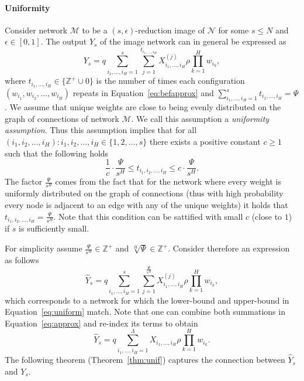 \documentclass[twoside]{article}
\begin{document}
\paragraph{Uniformity}
Consider network $\mathcal{M}$ to be a $(s,\epsilon)$-reduction image of $\mathcal{N}$ for some $s \leq N$ and $\epsilon \in [0,1]$. The output $Y_s$ of the image network can in general be expressed as
\[Y_s = q\sum_{i_1,\dots,i_H=1}^{s}\sum_{j=1}^{t_{i_1,\dots,i_H}}X_{i_1,\dots,i_H}^{(j)}\rho\prod_{k = 1}^{H}w_{i_k},
\]
where $t_{i_1,\dots,i_H} \in \{\mathbb{Z}^{+}\cup{0}\}$ is the number of times each configuration $(w_{i_1},w_{i_2},\dots,w_{i_H})$ repeats in Equation~\ref{eq:befapprox} and $\sum_{i_1,\dots,i_H=1}^{s}t_{i_1,\dots,i_H} = \Psi$. We assume that unique weights are close to being evenly distributed on the graph of connections of network $\mathcal{M}$. We call this assumption a \textit{uniformity assumption}. Thus this assumption implies that for all $(i_1,i_2,\dots,i_H):i_1,i_2,\dots,i_H \in \{1,2,\dots,s\}$ there exists a positive constant $c \geq 1$ such that the following holds
\begin{equation}
\frac{1}{c}\cdot\frac{\Psi}{s^H} \leq t_{i_1,i_2,\dots,i_H} \leq c\cdot\frac{\Psi}{s^H}.
\label{eq:uniform}
\end{equation}
The factor $\frac{\Psi}{s^H}$ comes from the fact that for the network where every weight is uniformly distributed on the graph of connections (thus with high probability every node is adjacent to an edge with any of the unique weights) it holds that $t_{i_1,i_2,\dots,i_H} = \frac{\Psi}{s^H}$. Note that this condition can be sattified with small $c$ (close to $1$) if $s$ is sufficiently small.

For simplicity assume $\frac{\Psi}{s^H} \in \mathbb{Z}^{+}$ and $\sqrt[H]{\Psi} \in \mathbb{Z}^{+}$. Consider therefore an expression as follows
\begin{equation}
\hat{Y}_s = q\sum_{i_1,\dots,i_H=1}^{s}\sum_{j=1}^{\frac{\Psi}{s^H}}X_{i_1,\dots,i_H}^{(j)}\rho\prod_{k = 1}^{H}w_{i_k},
\label{eq:approx}
\end{equation}
which corresponds to a network for which the lower-bound and upper-bound in Equation~\ref{eq:uniform} match. Note that one can combine both summations in Equation~\ref{eq:approx} and re-index its terms to obtain
\begin{equation}
\hat{Y}_s = q\sum_{i_1,\dots,i_H=1}^{\Lambda}X_{i_1,\dots,i_H}\rho\prod_{k = 1}^{H}w_{i_k}.
\label{eq:approxfinal}
\end{equation}
The following theorem (Theorem~\ref{thm:unif}) captures the connection between $\hat{Y}_s$ and $Y_{s}$.
\end{document}
